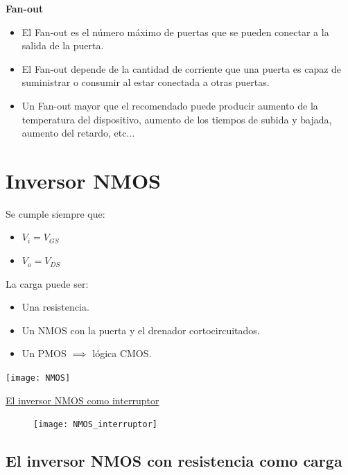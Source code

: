 \documentclass[10pt,a4paper]{article}
\begin{document}
	\textbf{Fan-out}
	\begin{itemize}
		\item El Fan-out es el número máximo de puertas que se pueden conectar a la salida de la puerta.
		\item El Fan-out depende de la cantidad de corriente que una puerta es capaz de suministrar o consumir al estar conectada a otras puertas.
		\item Un Fan-out mayor que el recomendado puede producir aumento de la temperatura del dispositivo, aumento de los tiempos de subida y bajada, aumento del retardo, etc...
	\end{itemize}
	
	\section{Inversor NMOS}
	
	\begin{minipage}{0.7\linewidth}
		\vspace*{0pt}
		Se cumple siempre que:
		\begin{itemize}
			\item $V_i = V_{GS}$
			\item $V_o = V_{DS}$
		\end{itemize}
		La carga puede ser:
		\begin{itemize}
			\item Una resistencia.
			\item Un NMOS con la puerta y el drenador cortocircuitados.
			\item Un PMOS $\implies$ lógica CMOS.
		\end{itemize}
	\end{minipage}%
	\begin{minipage}{0.3\linewidth}
		\vspace*{0pt}
		\texttt{[image: NMOS]}
	\end{minipage}
	\newpage
	
	\underline{{\large El inversor NMOS como interruptor}}
	
	\begin{figure}[h]
		\centering
		\texttt{[image: NMOS\_interruptor]}
	\end{figure}
	
	\subsection{El inversor NMOS con resistencia como carga}
\end{document}
